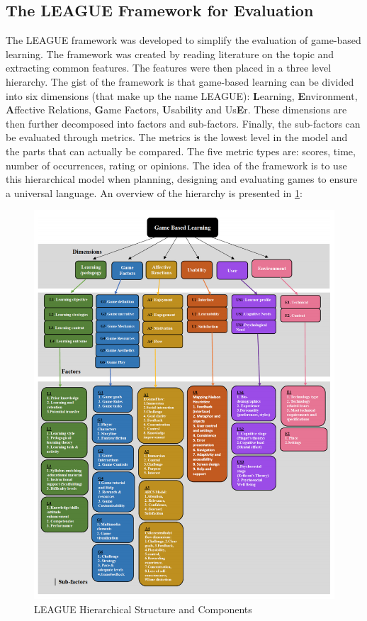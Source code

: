     \subsection{The LEAGUE Framework for Evaluation}
        \label{sec:league}
        The LEAGUE framework\cite{league} was developed to simplify the evaluation of game-based learning. The framework was created by reading literature on the topic and extracting common features. The features were then placed in a three level hierarchy. The gist of the framework is that game-based learning can be divided into six dimensions (that make up the name LEAGUE): \textbf{L}earning, \textbf{E}nvironment, \textbf{A}ffective Relations, \textbf{G}ame Factors, \textbf{U}sability and Us\textbf{E}r. These dimensions are then further decomposed into factors and sub-factors. Finally, the sub-factors can be evaluated through metrics. The metrics is the lowest level in the model and the parts that can actually be compared. The five metric types are: scores, time, number of occurrences, rating or opinions. The idea of the framework is to use this hierarchical model when planning, designing and evaluating games to ensure a universal language. An overview of the hierarchy is presented in \cref{fig:league}:
        
        \FloatBarrier
        \begin{figure}[htbp]
            \centering
            \includegraphics[width=\linewidth]{figures/league.PNG}
            \caption{LEAGUE Hierarchical Structure and Components}
            \label{fig:league}
        \end{figure}
        \FloatBarrier
        
